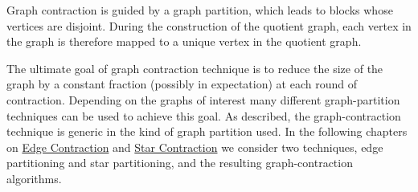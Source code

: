 \begin{important}
\label{graphcon::intro::graphcon::disjointness}
Graph contraction is guided by a graph partition, which leads to blocks whose vertices are disjoint.
%
During the construction of the quotient graph, each vertex in the
graph is therefore mapped to a unique vertex in the quotient graph.
\end{important}


\begin{gram}
\label{graphcon::intro::graphcon::apply}
The ultimate goal of graph contraction technique is to reduce the size
of the graph by a constant fraction (possibly in expectation) at each
round of contraction.
%
Depending on the graphs of interest many different graph-partition
techniques can be used to achieve this goal.
%
As described, the graph-contraction technique is generic in
the kind of graph partition used.
%
In the following chapters on
%
\href{ch:graphcon::edge}{Edge Contraction}
%
and
%
\href{ch:graphcon::star}{Star Contraction}
%
we consider two techniques, edge partitioning and star partitioning,
and the resulting graph-contraction algorithms.
%
\end{gram}

